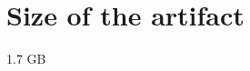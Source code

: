 \documentclass[a4paper,UKenglish]{darts}
\newcommand{\artifactsize}[1]{{\section{Size of the artifact}#1}}
\begin{document}
\artifactsize{1.7 GB}









%



\end{document}
